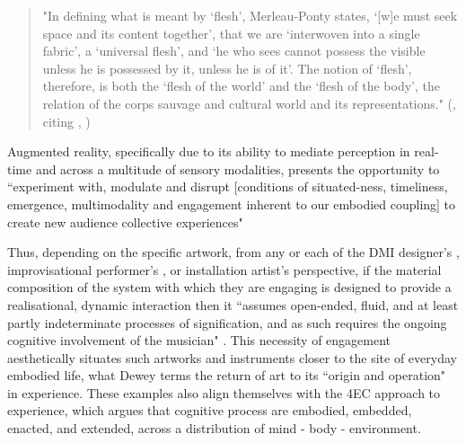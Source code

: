 \begin{quote}
    "In defining what is meant by `flesh', Merleau-Ponty states, `[w]e must seek space and its content together', that we are `interwoven into a single fabric', a `universal flesh', and `he who sees cannot possess the visible unless he is possessed by it, unless he is of it'. The notion of `flesh', therefore, is both the `flesh of the world' and the `flesh of the body', the relation of the corps sauvage and cultural world and its representations." (\citeauthor{chevalier2018}, \citeyearpar{chevalier2018}  citing \citeauthor{merleau-ponty1945}, \citeyearpar{merleau-ponty1945,merleau-ponty1968})
\end{quote}
Augmented reality, specifically due to its ability to mediate perception in real-time and across a multitude of sensory modalities, presents the opportunity to ``experiment with, modulate and disrupt [conditions of situated-ness, timeliness, emergence, multimodality and engagement inherent to our embodied coupling] to create new audience collective experiences" \citep[]{chevalier2018}

Thus, depending on the specific artwork, from any or each of the DMI designer's \citep[]{essl2006,armstrong2006}, improvisational performer's \citep[]{hayes2019}, or installation artist's \citep[]{chevalier2018} perspective, if the material composition of the system with which they are engaging is designed to provide a realisational, dynamic interaction then it ``assumes open-ended, fluid, and at least partly indeterminate processes of signification, and as such requires the ongoing cognitive involvement of the musician" \citep[p. 48]{armstrong2006}. This necessity of engagement aesthetically situates such artworks and instruments closer to the site of everyday embodied life, what Dewey terms the return of art to its ``origin and operation" in experience. These examples also align themselves with the 4EC approach to experience, which argues that cognitive process are embodied, embedded, enacted, and extended, across a distribution of mind - body - environment. 

